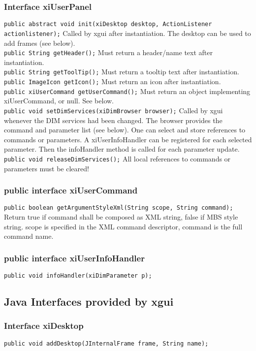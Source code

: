 \subsubsection{Interface xiUserPanel}
{\tt public abstract void init(xiDesktop desktop, ActionListener actionlistener);}
Called by xgui after instantiation. The desktop can be used to add frames (see below).\\
{\tt public String getHeader();}
Must return a header/name text after instantiation.\\
{\tt public String getToolTip();}
Must return a tooltip text after instantiation.\\
{\tt public ImageIcon getIcon();}
Must return an icon after instantiation.\\
{\tt public xiUserCommand getUserCommand();}
Must return an object implementing xiUserCommand, or null. See below.\\
{\tt public void setDimServices(xiDimBrowser browser);}
Called by xgui whenever the DIM services had been changed.
The browser provides the command and parameter list (see below). One can select and store references to commands or parameters. A xiUserInfoHandler can be registered for each selected parameter. Then the infoHandler method is called for each parameter update.\\
{\tt public void releaseDimServices();}
All local references to commands or parameters must be cleared!

\subsubsection{public interface xiUserCommand}
{\tt public boolean getArgumentStyleXml(String scope, String command);}
Return true if command shall be composed as XML string, false if MBS style string. scope is specified in the XML command descriptor, command is the full command name.

\subsubsection{public interface xiUserInfoHandler}
{\tt public void infoHandler(xiDimParameter p);}

\subsection{Java Interfaces provided by xgui}
\subsubsection{Interface xiDesktop}
{\tt public void addDesktop(JInternalFrame frame, String name);}

